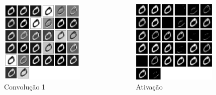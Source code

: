 \documentclass[tikz,10pt]{beamer}
\begin{document}
\begin{frame}
\begin{columns}
		\begin{column}{0.33\textwidth}
			\begin{figure}
				\includegraphics[height=4cm]{images/resultados/network_1/input_1_layer_convolution2d_1}
				\caption{Convolução 1}
			\end{figure}%
		\end{column}
		\begin{column}{0.33\textwidth}
			\begin{figure}
				\includegraphics[height=4cm]{images/resultados/network_1/input_1_layer_activation_1}%
				\caption{Ativação}			
			\end{figure}%
		\end{column}	
	\end{columns}
	
\end{frame}
\end{document}
